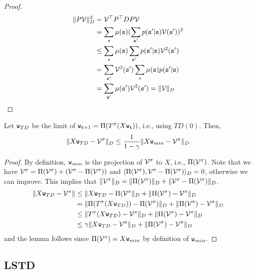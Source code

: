\begin{leftbar}
\begin{proof}
\begin{align*}
\|P\mathcal{V}\|_D^2 & =\mathcal{V}^\top P^\top D P \mathcal{V} \\
&= \sum_s \mu({\tt s}) (\sum_{{\tt s}'} p({\tt s}'|{\tt s}) \mathcal{V}({\tt s}'))^2\\
&\leq \sum_s \mu({\tt s}) \sum_{{\tt s}'} p({\tt s}'|{\tt s}) \mathcal{V}^2({\tt s}')\\
&=\sum_{{\tt s}'} \mathcal{V}^2({\tt s}') \sum_s \mu({\tt s})p({\tt s}'|{\tt s})\\
&=\sum_{{\tt s}'} \mu({\tt s}')\mathcal{V}^2({\tt s}')=\|\mathcal{V}\|_D
\end{align*}
\end{proof}

\begin{lemma}
Let ${\tt w}_{TD}$ be the limit of
${\tt w}_{{\tt t}+1}=\Pi(T^\pi(X{\tt w}_{\tt t}))$, i.e., using
$TD(0)$. Then,
\[
\|X{\tt w}_{TD}-\mathcal{V}^\pi\|_D\leq
\frac{1}{1-\gamma}\|X{\tt w}_{min}-\mathcal{V}^\pi\|_D
\]
\end{lemma}

\begin{proof}
By definition, ${\tt w}_{min}$ is the projection of $\mathcal{V}^\pi$
to $X$, i.e., $\Pi(\mathcal{V}^\pi)$. Note that we have
$\mathcal{V}^\pi=
\Pi(\mathcal{V}^\pi)+(\mathcal{V}^\pi-\Pi(\mathcal{V}^\pi))$ and
$\langle\Pi(\mathcal{V}^\pi),\mathcal{V}^\pi-\Pi(\mathcal{V}^\pi)\rangle_D=0$,
otherwise we can improve. This implies that
$\|\mathcal{V}^\pi\|_D=\|\Pi(\mathcal{V}^\pi)\|_D+\|\mathcal{V}^\pi-\Pi(\mathcal{V}^\pi)\|_D$.
\begin{align*}
\|X{\tt w}_{TD}-\mathcal{V}^\pi\| &\leq
\|X{\tt w}_{TD}-\Pi(\mathcal{V}^\pi\|_D+\|\Pi(\mathcal{V}^\pi)-\mathcal{V}^\pi\|_D\\
&= \|\Pi(T^\pi(X{\tt w}_{TD}))-\Pi(\mathcal{V}^\pi)\|_D+\|\Pi(\mathcal{V}^\pi)-\mathcal{V}^\pi\|_D\\
&\leq \|T^\pi(X{\tt w}_{TD})-\mathcal{V}^\pi\|_D+\|\Pi(\mathcal{V}^\pi)-\mathcal{V}^\pi\|_D\\
&\leq \gamma \|X{\tt w}_{TD}-\mathcal{V}^\pi\|_D+\|\Pi(\mathcal{V}^\pi)-\mathcal{V}^\pi\|_D\\
\end{align*}
and the lemma follows since $\Pi(\mathcal{V}^\pi)=X{\tt w}_{min}$ by
definition of ${\tt w}_{min}$.
\end{proof}


\subsection{LSTD}



\end{leftbar}
